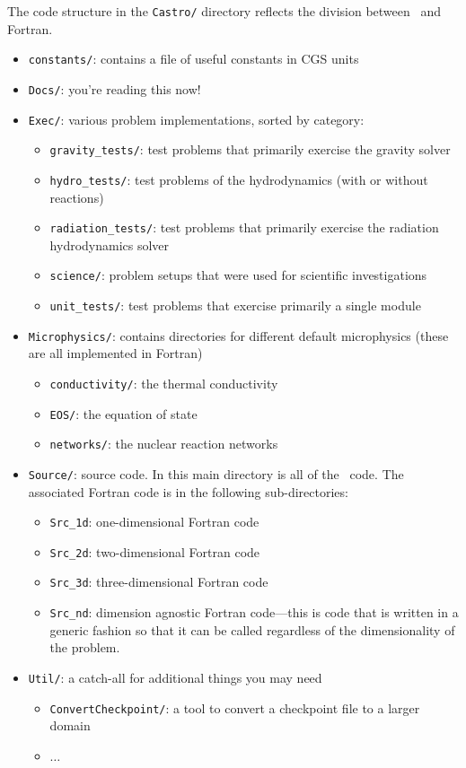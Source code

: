 The code structure in the {\tt Castro/} directory reflects the
division between \cpp\ and Fortran.
\begin{itemize}
\item {\tt constants/}: contains a file of useful constants in CGS units

\item {\tt Docs/}: you're reading this now!

\item {\tt Exec/}: various problem implementations, sorted by category:
  \begin{itemize}
  \item {\tt gravity\_tests/}: test problems that primarily exercise the gravity solver
  \item {\tt hydro\_tests/}: test problems of the hydrodynamics (with or without reactions)
  \item {\tt radiation\_tests/}: test problems that primarily exercise the radiation hydrodynamics solver
  \item {\tt science/}: problem setups that were used for scientific investigations
  \item {\tt unit\_tests/}: test problems that exercise primarily a single module
  \end{itemize}

\item {\tt Microphysics/}: contains directories for different default
  microphysics (these are all implemented in Fortran)
  \begin{itemize}
  \item {\tt conductivity/}: the thermal conductivity
  \item {\tt EOS/}: the equation of state
  \item {\tt networks/}: the nuclear reaction networks
  \end{itemize}

\item {\tt Source/}: source code.  In this main directory is all of
  the \cpp\ code.  The associated Fortran code is in the following
  sub-directories:
  \begin{itemize}
  \item {\tt Src\_1d}: one-dimensional Fortran code
  \item {\tt Src\_2d}: two-dimensional Fortran code
  \item {\tt Src\_3d}: three-dimensional Fortran code
  \item {\tt Src\_nd}: dimension agnostic Fortran code---this is code that
    is written in a generic fashion so that it can be called regardless
    of the dimensionality of the problem.
  \end{itemize}
\item {\tt Util/}: a catch-all for additional things you may need
  \begin{itemize}
  \item {\tt ConvertCheckpoint/}: a tool to convert a checkpoint file to
     a larger domain
  \item $\ldots$
  \end{itemize}


\end{itemize}


